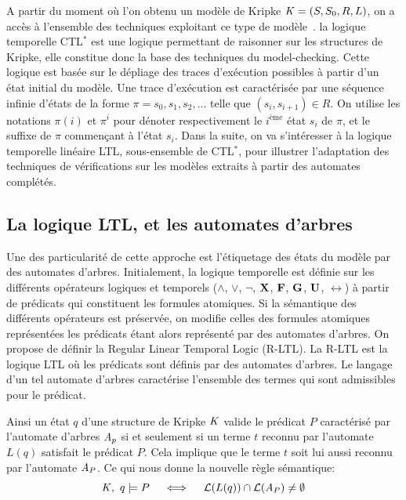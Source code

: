 A partir du moment où l'on obtenu un modèle de Kripke $\mathit K = (S, S_0,
R, L)$, on a accès à l'ensemble des techniques exploitant ce type de
modèle~\cite{MC-Book}. la logique temporelle CTL$^*$ est une logique permettant
de raisonner sur les structures de Kripke, elle constitue donc la base des techniques
du model-checking. Cette logique est basée sur le dépliage des traces
d'exécution possibles à partir d'un état initial du modèle. Une trace
d'exécution est caractérisée par une séquence infinie d'états de la
forme $\pi = s_0, s_1, s_2, \dots$ telle que $(s_i, s_{i+1}) \in
R$. On utilise les notations $\pi(i)$ et $\pi^i$ pour dénoter respectivement
le $i^\text{ème}$ état $s_i$ de $\pi$, et le suffixe de $\pi$ commençant à l'état $s_i$.
Dans la suite, on va s'intéresser à la logique temporelle linéaire LTL, sous-ensemble de CTL$^*$,
pour illustrer l'adaptation des techniques de vérifications sur les modèles extraits à partir 
des automates complétés.


\subsection{La logique LTL, et les automates d'arbres}

Une des particularité de cette approche est l'étiquetage des états du modèle par des automates d'arbres.
Initialement, la logique temporelle est définie sur les différents opérateurs logiques et temporels
($\land$, $\lor$, $\neg$, $\mathbf X$, $\mathbf F$, $\mathbf G$, $\mathbf U$, $\rel$) à partir de prédicats qui constituent 
les formules atomiques. Si la sémantique des différents opérateurs est préservée, on modifie celles des
formules atomiques représentées les prédicats étant alors représenté par des automates d'arbres.
On propose de définir la Regular Linear Temporal Logic (R-LTL). La R-LTL est la logique LTL où les prédicats sont définis par des
automates d'arbres. Le langage d'un tel automate d'arbres caractérise l'ensemble des termes qui sont admissibles pour le prédicat.

Ainsi un état $q$ d'une structure de Kripke $\mathit K$ valide le prédicat $P$ caractérisé
par l'automate d'arbres  $\mathit A_p$ si et seulement si un terme $t$ reconnu par l'automate
$L(q)$ satisfait le prédicat $P$. Cela implique que le terme $t$ soit lui aussi reconnu
par l'automate $\mathit A_P$. Ce qui nous donne la nouvelle règle sémantique:
\[\mathit K,\ q \models P\quad \; \Longleftrightarrow \;\quad \mathcal{L}{}(L(q)) \cap \mathcal{L}{}(\mathit A_P) \neq \emptyset\]

